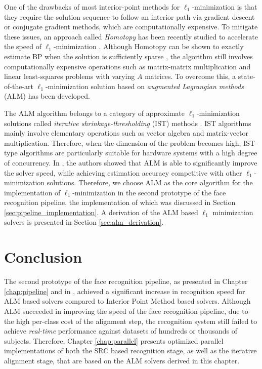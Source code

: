 One of the drawbacks of most interior-point methods for $\ell_1$-minimization
is that they require the solution sequence to follow an interior path via
gradient descent or conjugate gradient methods, which are computationally
expensive.  To mitigate these issues, an approach called \emph{Homotopy} has
been recently studied to accelerate the speed of $\ell_1$-minimization
\cite{OsborneM2000,EfronB2004,MalioutovD2005,DonohoD2006}.  Although Homotopy
can be shown to exactly estimate BP when the solution is sufficiently sparse
\cite{DonohoD2006}, the algorithm still involves computationally expensive
operations such as matrix-matrix multiplication and linear least-squares
problems with varying $A$ matrices.  To overcome this, a state-of-the-art
$\ell_1$-minimization solution based on \emph{augmented Lagrangian methods}
(ALM) \cite{BertsekasD2003,YangA2010-ICIP} has been developed.

The ALM algorithm belongs to a category of approximate $\ell_1$-minimization
solutions called \emph{iterative shrinkage-thresholding} (IST) methods
\cite{WrightS2008,BeckA2009}.  IST algorithms mainly involve elementary
operations such as vector algebra and matrix-vector multiplication. Therefore,
when the dimension of the problem becomes high, IST-type algorithms are
particularly suitable for hardware systems with a high degree of concurrency.
In \cite{YangA2010-ICIP}, the authors showed that ALM is able to significantly
improve the solver speed, while achieving estimation accuracy competitive with
other $\ell_1$-minimization solutions. Therefore, we choose ALM as the core
algorithm for the implementation of $\ell_1$-minimization in the second
prototype of the face recognition pipeline, the implementation of which was
discussed in Section \ref{sec:pipeline_implementation}.  A derivation of the
ALM based $\ell_1$ minimization solvers is presented in Section
\ref{sec:alm_derivation}.



%
%
%

\section{Conclusion}
The second prototype of the face recognition pipeline, as presented in Chapter
\ref{chap:pipeline} and in \cite{WagnerA2011-PAMI}, achieved a significant
increase in recognition speed for ALM based solvers compared to Interior Point
Method based solvers.  Although ALM succeeded in improving the speed of the
face recognition pipeline, due to the high per-class cost of the alignment
step, the recognition system still failed to achieve \emph{real-time}
performance against datasets of hundreds or thousands of subjects.  Therefore,
Chapter \ref{chap:parallel} presents optimized parallel implementations of both
the SRC based recognition stage, as well as the iterative alignment stage, that
are based on the ALM solvers derived in this chapter.



